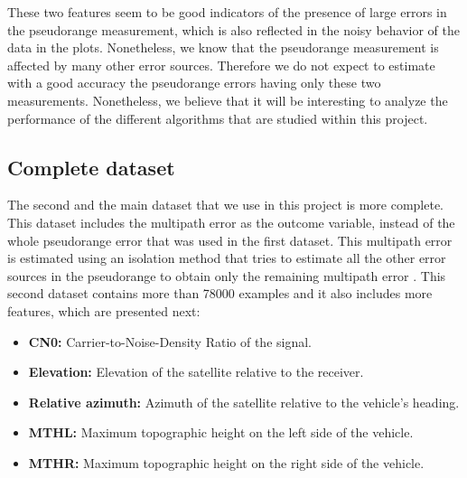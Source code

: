 \documentclass[a4paper, report, oneside, UKenglish]{memoir}
\begin{document}
These two features seem to be good indicators of the presence of large errors in the pseudorange measurement, which is also reflected in the noisy behavior of the data in the plots. Nonetheless, we know that the pseudorange measurement is affected by many other error sources. Therefore we do not expect to estimate with a good accuracy the pseudorange errors having only these two measurements. Nonetheless, we believe that it will be interesting to analyze the performance of the different algorithms that are studied within this project.



\subsection{Complete dataset}
The second and the main dataset that we use in this project is more complete. This dataset includes the multipath error as the outcome variable, instead of the whole pseudorange error that was used in the first dataset. This multipath error is estimated using an isolation method that tries to estimate all the other error sources in the pseudorange to obtain only the remaining multipath error \cite{matera_chatacterization_2019}. This second dataset contains more than 78000 examples and it also includes more features, which are presented next:

\begin{itemize}
    \item \textbf{CN0:} Carrier-to-Noise-Density Ratio of the signal.
    \item \textbf{Elevation:} Elevation of the satellite relative to the receiver.
    \item \textbf{Relative azimuth:} Azimuth of the satellite relative to the vehicle's heading.
    \item \textbf{MTHL:} Maximum topographic height on the left side of the vehicle.
    \item \textbf{MTHR:} Maximum topographic height on the right side of the vehicle.
\end{itemize}
\end{document}
